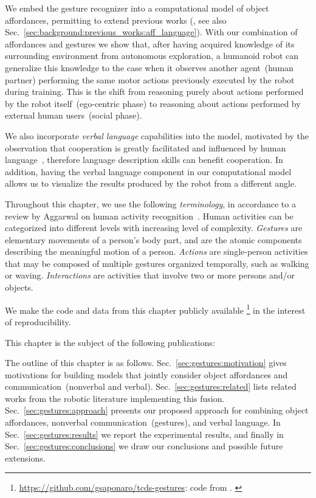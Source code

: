 We embed the gesture recognizer into a computational model of object affordances, permitting to extend previous works (\cite{salvi:2012:smcb}, see also Sec.~\ref{sec:background:previous_works:aff_language}).
With our combination of affordances and gestures we show that, after having acquired knowledge of its surrounding environment from autonomous exploration, a humanoid robot can generalize this knowledge to the case when it observes another agent~(human partner) performing the same motor actions previously executed by the robot during training.
This is the shift from reasoning purely about actions performed by the robot itself~(ego-centric phase) to reasoning about actions performed by external human users~(social phase).

We also incorporate \emph{verbal language} capabilities into the model, motivated by the observation that \hh{} cooperation is greatly facilitated and influenced by human language~\cite{mueller:2000:psych}, therefore language description skills can benefit \hr{} cooperation.
In addition, having the verbal language component in our computational model allows us to visualize the results produced by the robot from a different angle.

Throughout this chapter, we use the following \emph{terminology}, in accordance to a review by Aggarwal on human activity recognition~\cite{aggarwal:2011}. \label{para:action_terminology}
Human activities can be categorized into different levels with increasing level of complexity.
\emph{Gestures} are elementary movements of a person's body part, and are the atomic components describing the meaningful motion of a person.
\emph{Actions} are single-person activities that may be composed of multiple gestures organized temporally, such as walking or waving.
\emph{Interactions} are activities that involve two or more persons and/or objects.

We make the code and data from this chapter publicly available%
\footnote{\url{https://github.com/gsaponaro/tcds-gestures}: code from \cite{saponaro:2019:language}. \label{footnote:tcds-gestures_url}%
} in the interest of reproducibility.

This chapter is the subject of the following publications:
\listPublicationsGestures

The outline of this chapter is as follows.
Sec.~\ref{sec:gestures:motivation} gives motivations for building models that jointly consider object affordances and communication~(nonverbal and verbal).
Sec.~\ref{sec:gestures:related} lists related works from the robotic literature implementing this fusion.
Sec.~\ref{sec:gestures:approach} presents our proposed approach for combining object affordances, nonverbal communication~(gestures), and verbal language.
In Sec.~\ref{sec:gestures:results} we report the experimental results,
and finally in Sec.~\ref{sec:gestures:conclusions} we draw our conclusions and possible future extensions.

